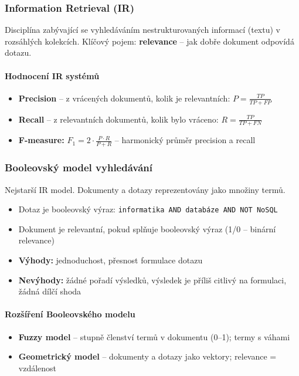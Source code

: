 \subsubsection{Information Retrieval (IR)}

Disciplína zabývající se vyhledáváním nestrukturovaných informací (textu) v rozsáhlých kolekcích.
Klíčový pojem: \textbf{relevance} -- jak dobře dokument odpovídá dotazu.

\paragraph{Hodnocení IR systémů}
\begin{itemize}
  \item \textbf{Precision} -- z vrácených dokumentů, kolik je relevantních: $P = \frac{TP}{TP+FP}$
  \item \textbf{Recall} -- z relevantních dokumentů, kolik bylo vráceno: $R = \frac{TP}{TP+FN}$
  \item \textbf{F-measure:} $F_1 = 2 \cdot \frac{P \cdot R}{P + R}$ -- harmonický průměr precision a recall
\end{itemize}

\subsubsection{Booleovský model vyhledávání}

Nejstarší IR model. Dokumenty a dotazy reprezentovány jako množiny termů.

\begin{itemize}
  \item Dotaz je booleovský výraz: \texttt{informatika AND databáze AND NOT NoSQL}
  \item Dokument je relevantní, pokud splňuje booleovský výraz (1/0 -- binární relevance)
  \item \textbf{Výhody:} jednoduchost, přesnost formulace dotazu
  \item \textbf{Nevýhody:} žádné pořadí výsledků, výsledek je příliš citlivý na formulaci, žádná dílčí shoda
\end{itemize}

\paragraph{Rozšíření Booleovského modelu}
\begin{itemize}
  \item \textbf{Fuzzy model} -- stupně členství termů v dokumentu (0--1); termy s váhami
  \item \textbf{Geometrický model} -- dokumenty a dotazy jako vektory; relevance = vzdálenost
\end{itemize}

